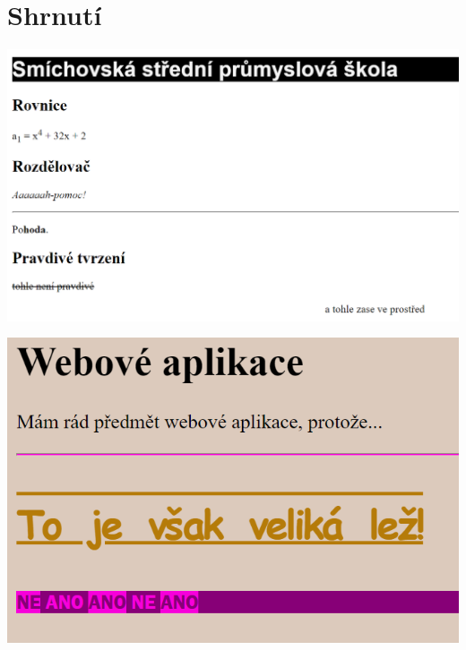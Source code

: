 \documentclass[aspectratio=1610]{beamer}
\begin{document}
\section{Shrnutí}

\begin{frame}
    \begin{center}
        \includegraphics[width=\textwidth]{img/html-7-8-ukol.png}
    \end{center}
\end{frame}

\begin{frame}
    \begin{center}
        \includegraphics[width=\textwidth]{img/html-7-8-ukol-2.png}
    \end{center}
\end{frame}
\end{document}
